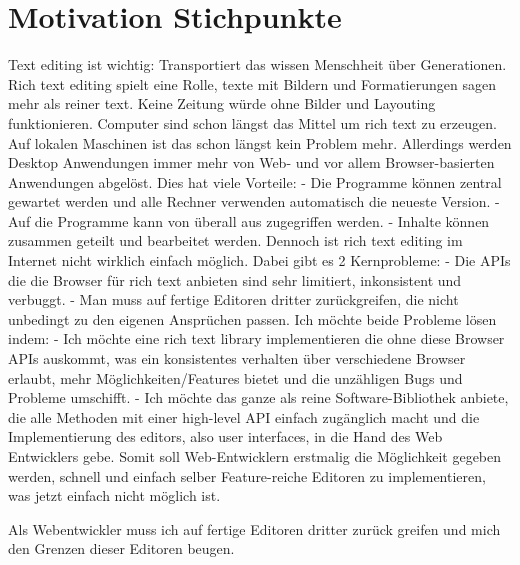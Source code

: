 

\section{Motivation Stichpunkte}

Text editing ist wichtig: Transportiert das wissen Menschheit über Generationen.
Rich text editing spielt eine Rolle, texte mit Bildern und Formatierungen sagen mehr als reiner text. Keine Zeitung würde ohne Bilder und Layouting funktionieren.
Computer sind schon längst das Mittel um rich text zu erzeugen.
Auf lokalen Maschinen ist das schon längst kein Problem mehr.
Allerdings werden Desktop Anwendungen immer mehr von Web- und vor allem Browser-basierten Anwendungen abgelöst.
Dies hat viele Vorteile:
 - Die Programme können zentral gewartet werden und alle Rechner verwenden automatisch die neueste Version.
 - Auf die Programme kann von überall aus zugegriffen werden.
 - Inhalte können zusammen geteilt und bearbeitet werden.
Dennoch ist rich text editing im Internet nicht wirklich einfach möglich.
Dabei gibt es 2 Kernprobleme:
 - Die APIs die die Browser für rich text anbieten sind sehr limitiert, inkonsistent und verbuggt.
 - Man muss auf fertige Editoren dritter zurückgreifen, die nicht unbedingt zu den eigenen Ansprüchen passen.
Ich möchte beide Probleme lösen indem:
 - Ich möchte eine rich text library implementieren die ohne diese Browser APIs auskommt, was ein konsistentes verhalten über verschiedene Browser erlaubt, mehr Möglichkeiten/Features bietet und die unzähligen Bugs und Probleme umschifft.
 - Ich möchte das ganze als reine Software-Bibliothek anbiete, die alle Methoden mit einer high-level API einfach zugänglich macht und die Implementierung des editors, also user interfaces, in die Hand des Web Entwicklers gebe.
Somit soll Web-Entwicklern erstmalig die Möglichkeit gegeben werden, schnell und einfach selber Feature-reiche Editoren zu implementieren, was jetzt einfach nicht möglich ist.


Als Webentwickler muss ich auf fertige Editoren dritter zurück greifen und mich den Grenzen dieser Editoren beugen.



